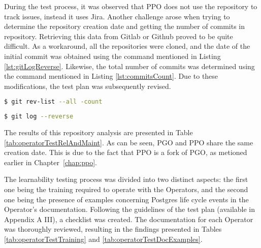 During the test process, it was observed that PPO does not use the repository to track issues, instead it uses Jira. Another challenge arose when trying to determine the repository creation date and getting the number of commits in repository. Retrieving this data from Gitlab or Github proved to be quite difficult. As a workaround, all the repositories were cloned, and the date of the initial commit was obtained using the command mentioned in Listing \ref{lst:gitLogReverse}.
Likewise, the total number of commits was determined using the command mentioned in Listing \ref{lst:commitsCount}. Due to these modifications, the test plan was subsequently revised.

\begin{lstlisting}[language=bash, caption={Commits count}, label={lst:commitsCount}]
        $ git rev-list --all -count
    \end{lstlisting}

\begin{lstlisting}[language=bash, caption={Reverse git log}, label={lst:gitLogReverse}]
        $ git log --reverse
\end{lstlisting}

The results of this repository analysis are presented in Table \ref{tab:operatorTestRelAndMaint}. As can be seen, PGO and PPO share the same creation date. This is due to the fact that PPO is a fork of PGO, as metioned earlier in Chapter~\ref{chap:ppo}.

The learnability testing process was divided into two distinct aspects: the first one being the training required to operate with the Operators, and the second one being the presence of examples concerning Postgres life cycle events in the Operator's documentation. Following the guidelines of the test plan (available in Appendix A III), a checklist was created. The documentation for each Operator was thoroughly reviewed, resulting in the findings presented in Tables \ref{tab:operatorTestTraining} and \ref{tab:operatorTestDocExamples}.

